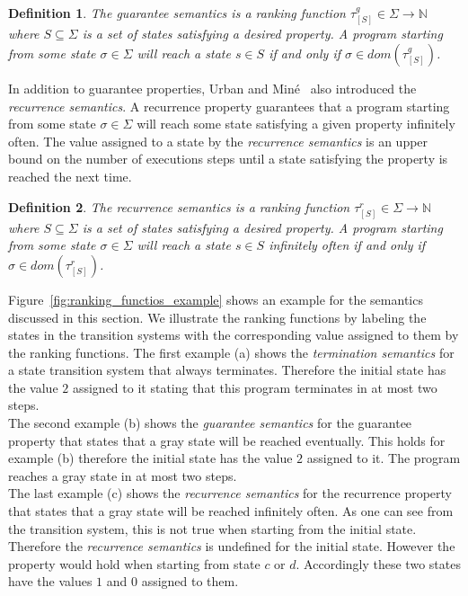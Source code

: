 \documentclass[11pt,a4paper,titlepage]{article}
\newtheorem{definition}{Definition}[section]
\begin{document}
\begin{definition}
    The \textit{guarantee semantics} is a ranking function 
    $\tau_{[S]}^{g} \in \Sigma \rightarrow \mathbb{N}$
    where $S \subseteq \Sigma$ is a set of states satisfying a desired property.
    A program starting from some state $\sigma \in \Sigma$ will reach a state 
    $s \in S$ if and only if $\sigma \in dom(\tau_{[S]}^{g})$.
\end{definition}

In addition to guarantee properties, Urban and Miné~\cite{UrbanM-VMCAI15} also introduced the \textit{recurrence semantics}.
A recurrence property guarantees that a program starting from some state $\sigma \in \Sigma$ will reach some state satisfying
a given property infinitely often. The value assigned to a state by the \textit{recurrence semantics}
is an upper bound on the number of executions steps until a state satisfying the property is reached the next time. 

\begin{definition}
    The \textit{recurrence semantics} is a ranking function 
    $\tau_{[S]}^{r} \in \Sigma \rightarrow \mathbb{N}$
    where $S \subseteq \Sigma$ is a set of states satisfying a desired property.
    A program starting from some state $\sigma \in \Sigma$ will reach a state 
    $s \in S$ infinitely often if and only if $\sigma \in dom(\tau_{[S]}^{r})$.
\end{definition}

Figure~\ref{fig:ranking_functios_example} shows an example for the semantics discussed in this section.
We illustrate the ranking functions by labeling the states in the transition systems with the corresponding value assigned to them by the ranking functions. 
The first example (a) shows the \textit{termination semantics} for a state transition system that always terminates. Therefore the initial state
has the value $2$ assigned to it stating that this program terminates in at most two steps.\\

The second example (b) shows the \textit{guarantee semantics} for the guarantee property that states that a gray state will be reached eventually.
This holds for example (b) therefore the initial state has the value $2$ assigned to it. The program reaches a gray state in at most two steps.\\

The last example (c) shows the \textit{recurrence semantics} for the recurrence property that states that a gray state will be reached infinitely often.
As one can see from the transition system, this is not true when starting from the initial state. Therefore the \textit{recurrence semantics} is undefined
for the initial state. However the property would hold when starting from state $c$ or $d$. 
Accordingly these two states have the values $1$ and $0$ assigned to them.\\
\end{document}
